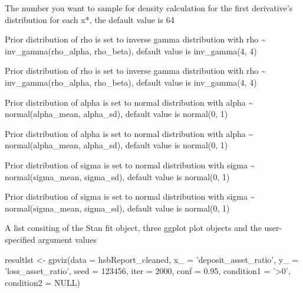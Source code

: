\begin{Arguments}
\begin{ldescription}
\item[\code{dn}] The number you want to sample for density calculation for the first derivative's distribution for each x*, the default value is 64

\item[\code{rho\_alpha}] Prior distribution of rho is set to inverse gamma distribution with rho \textasciitilde{} inv\_gamma(rho\_alpha, rho\_beta), default value is inv\_gamma(4, 4)

\item[\code{rho\_beta}] Prior distribution of rho is set to inverse gamma distribution with rho \textasciitilde{} inv\_gamma(rho\_alpha, rho\_beta), default value is inv\_gamma(4, 4)

\item[\code{alpha\_mean}] Prior distribution of alpha is set to normal distribution with alpha \textasciitilde{} normal(alpha\_mean, alpha\_sd), default value is normal(0, 1)

\item[\code{alpha\_sd}] Prior distribution of alpha is set to normal distribution with alpha \textasciitilde{} normal(alpha\_mean, alpha\_sd), default value is normal(0, 1)

\item[\code{sigma\_mean}] Prior distribution of sigma is set to normal distribution with sigma \textasciitilde{} normal(sigma\_mean, sigma\_sd), default value is normal(0, 1)

\item[\code{sigma\_sd}] Prior distribution of sigma is set to normal distribution with sigma \textasciitilde{} normal(sigma\_mean, sigma\_sd), default value is normal(0, 1)
\end{ldescription}
\end{Arguments}
%
\begin{Value}
A list consiting of the Stan fit object, three ggplot plot objects and the user-specified argument values
\end{Value}
%
\begin{Examples}
\begin{ExampleCode}
resultlst <- gpviz(data = hsbReport_cleaned, x_ = 'deposit_asset_ratio', y_ = 'loss_asset_ratio', seed = 123456, iter = 2000, conf = 0.95, condition1 = '>0', condition2 = NULL)
\end{ExampleCode}
\end{Examples}
